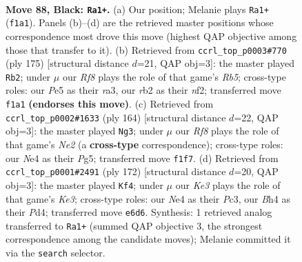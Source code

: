 \documentclass[11pt]{article}
\begin{document}
\clearpage

\begin{figure}[p]\centering
\begin{subfigure}{0.46\textwidth}\centering
\resizebox{\linewidth}{!}{%
\newchessgame
\chessboard[
  setfen={8/8/4k2p/3pp3/4n2b/K7/1R6/5r2 b - - 1 88},
  showmover=false,
  pgfstyle=straightmove, color=movearrow, markmove={f1-a1}
]}
\caption{}
\end{subfigure}\hfill
\begin{subfigure}{0.46\textwidth}\centering
\resizebox{\linewidth}{!}{%
\newchessgame
\chessboard[
  setfen={8/8/5p2/4nk2/1r6/R7/5N2/5K2 b - - 19 88},
  showmover=false,
  pgfstyle=straightmove, color=movearrow, markmove={b4-b2}
]}
\caption{}
\end{subfigure}
\\[4pt]
\begin{subfigure}{0.46\textwidth}\centering
\resizebox{\linewidth}{!}{%
\newchessgame
\chessboard[
  setfen={8/8/2r3p1/3k2P1/5P2/5K2/4N3/8 w - - 2 83},
  showmover=false,
  pgfstyle=straightmove, color=movearrow, markmove={e2-g3}
]}
\caption{}
\end{subfigure}\hfill
\begin{subfigure}{0.46\textwidth}\centering
\resizebox{\linewidth}{!}{%
\newchessgame
\chessboard[
  setfen={8/7r/6k1/p7/P1pPN3/2P1K3/8/8 w - - 3 87},
  showmover=false,
  pgfstyle=straightmove, color=movearrow, markmove={e3-f4}
]}
\caption{}
\end{subfigure}
\caption{\textbf{Move 88, Black: \texttt{Ra1+}.} (a) Our position; Melanie plays \texttt{Ra1+} (\texttt{f1a1}). Panels (b)--(d) are the retrieved master positions whose correspondence most drove this move (highest QAP objective among those that transfer to it). (b) Retrieved from \texttt{ccrl\_top\_p0003\#770} (ply 175) [structural distance $d$=21, QAP obj=3]: the master played \texttt{Rb2}; under $\mu$ our \emph{Rf8} plays the role of that game's \emph{Rb5}; cross-type roles: our \emph{P}e5 as their \emph{r}a3, our \emph{r}b2 as their \emph{n}f2; transferred move \texttt{f1a1} \textbf{(endorses this move)}. (c) Retrieved from \texttt{ccrl\_top\_p0002\#1633} (ply 164) [structural distance $d$=22, QAP obj=3]: the master played \texttt{Ng3}; under $\mu$ our \emph{Rf8} plays the role of that game's \emph{Ne2} (a \textbf{cross-type} correspondence); cross-type roles: our \emph{N}e4 as their \emph{P}g5; transferred move \texttt{f1f7}. (d) Retrieved from \texttt{ccrl\_top\_p0001\#2491} (ply 172) [structural distance $d$=20, QAP obj=3]: the master played \texttt{Kf4}; under $\mu$ our \emph{Ke3} plays the role of that game's \emph{Ke3}; cross-type roles: our \emph{N}e4 as their \emph{P}c3, our \emph{B}h4 as their \emph{P}d4; transferred move \texttt{e6d6}. Synthesis: 1 retrieved analog transferred to \texttt{Ra1+} (summed QAP objective 3, the strongest correspondence among the candidate moves); Melanie committed it via the \texttt{search} selector.}
\label{fig:thought-m175}
\end{figure}
\end{document}
